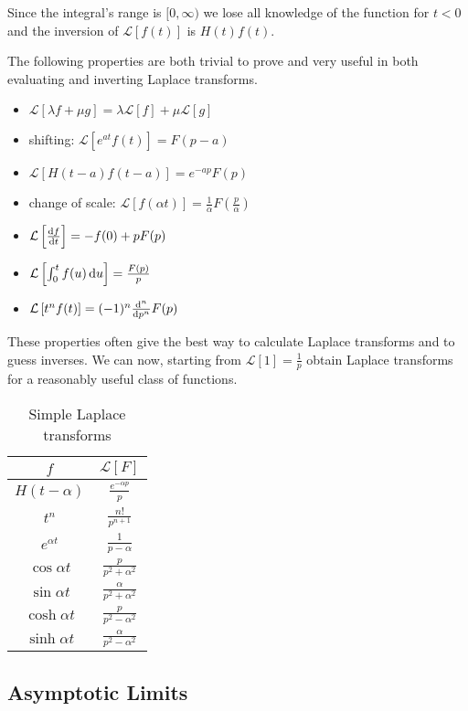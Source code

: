 \documentclass{notes}
\newcommand{\cL}[1]{\mathcal{L}\left[#1\right]}
\theoremstyle{plain}
\begin{document}
Since the integral's range is $[0,\infty)$ we lose all knowledge of
the function for $t < 0$ and the inversion of $\cL{f(t)}$ is $H(t)
f(t)$.

The following properties are both trivial to prove and very useful in
both evaluating and inverting Laplace transforms.

\begin{itemize}\label{it:Lapl}
\item $\cL{\lambda f + \mu g} = \lambda \cL{f} + \mu \cL{g}$
\item shifting: $\cL{e^{a t} f(t)} = F(p-a)$
\item $\cL{H(t-a) f(t-a)} = e^{-a p} F(p)$
\item change of scale: $\cL{f(\alpha t)} = \frac{1}{\alpha}
F(\frac{p}{\alpha})$
\item $\cL{\diff{f}{t}} = -f(0) + p F(p)$
\item $\cL{\int_0^t f(u)\, \ud u} = \frac{F(p)}{p}$
\item $\cL{t^n f(t)} = (-1)^n \diff{^n}{p^n} F(p)$
\end{itemize}

These properties often give the best way to calculate Laplace
transforms and to guess inverses.  We can now, starting from $\cL{1} =
\frac{1}{p}$ obtain Laplace transforms for a reasonably useful class
of functions.

\begin{table} \label{tab:Lapl}
\begin{center}
\begin{tabular}{c | c}
$f$ & $\cL{F}$ \\ \hline
$H(t-\alpha)$ & $\tfrac{e^{-\alpha p}}{p}$ \\
$t^n$ & $\tfrac{n!}{p^{n+1}}$ \\
$e^{\alpha t}$ & $\tfrac{1}{p-\alpha}$ \\
$\cos \alpha t$ & $\tfrac{p}{p^2 + \alpha^2}$ \\
$\sin \alpha t$ & $\tfrac{\alpha}{p^2 + \alpha^2}$ \\
$\cosh \alpha t$ & $\tfrac{p}{p^2 - \alpha^2}$ \\
$\sinh \alpha t$ & $\tfrac{\alpha}{p^2 - \alpha^2}$ \\
\end{tabular}
\end{center}
\caption{Simple Laplace transforms}
\end{table}

\subsection{Asymptotic Limits}
\end{document}
